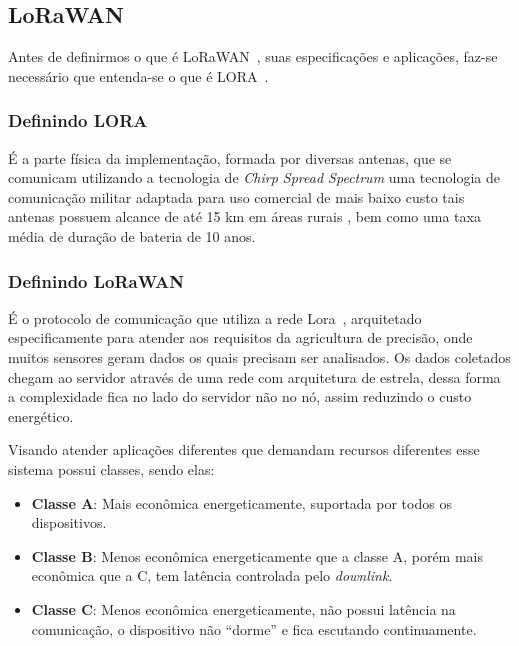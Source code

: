 \documentclass[
article,			%
12pt,				%
oneside,			%
a4paper,			%
english,			%
brazil,				%
sumario=tradicional
]{abntex2}
\begin{document}
\subsection{LoRaWAN~\texttrademark}\label{LoRaWAN}
Antes de definirmos o que é LoRaWAN~\texttrademark, suas especificações e aplicações, faz-se necessário que entenda-se o que é LORA~\textregistered.

\subsubsection{Definindo LORA~\textregistered}\label{Definindo LORA}
É a parte física da implementação, formada por diversas antenas\cite{siteLorawan}, que se comunicam utilizando a tecnologia de \textit{Chirp Spread Spectrum}\cite{lorawan} uma tecnologia de comunicação militar adaptada para uso comercial de mais baixo custo\cite{siteLorawan} tais antenas possuem alcance de até 15 km em áreas rurais %
\cite{limiteLora}, bem como uma taxa média de duração de bateria de 10 anos\cite{limiteLora}.

\subsubsection{Definindo LoRaWAN~\texttrademark}\label{Definindo LoRaWAN}

É o protocolo de comunicação que utiliza a rede Lora~\textregistered\cite{siteLorawan}, arquitetado especificamente para atender aos requisitos da agricultura de precisão, onde muitos sensores geram dados os quais precisam ser analisados\cite{lorawan}. Os dados coletados chegam ao servidor através de uma rede com arquitetura de estrela\cite{siteLorawan}, dessa forma a complexidade fica no lado do servidor não no nó, assim reduzindo o custo energético.

Visando atender aplicações diferentes que demandam recursos diferentes esse sistema possui classes\cite{siteLorawan}, sendo elas:
\begin{itemize}
	\item \textbf{Classe A}: Mais econômica energeticamente, suportada por todos os dispositivos.
	\item \textbf{Classe B}: Menos econômica energeticamente que a classe A, porém mais econômica que a C, tem latência controlada pelo \textit{downlink}.
	\item \textbf{Classe C}: Menos econômica energeticamente, não possui latência na comunicação, o dispositivo não ``dorme'' e fica escutando continuamente.
\end{itemize}
\end{document}
